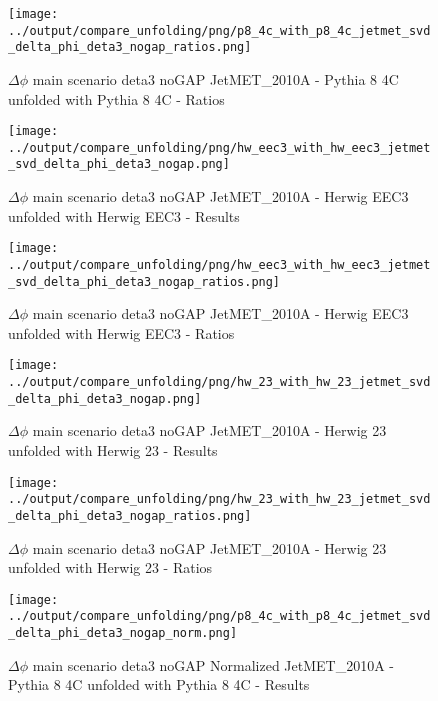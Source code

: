 \documentclass[11pt]{book}
\begin{document}
\begin{figure}[ht]
\centering
\texttt{[image: ../output/compare\_unfolding/png/p8\_4c\_with\_p8\_4c\_jetmet\_svd\_delta\_phi\_deta3\_nogap\_ratios.png]}
\caption{$\Delta\phi$ main scenario deta3 noGAP JetMET\_2010A - Pythia 8 4C unfolded with Pythia 8 4C - Ratios}
\label{p8_p8_jetmet_svd_delta_phi_deta3_nogap_b}
\end{figure}

\begin{figure}[ht]
\centering
\texttt{[image: ../output/compare\_unfolding/png/hw\_eec3\_with\_hw\_eec3\_jetmet\_svd\_delta\_phi\_deta3\_nogap.png]}
\caption{$\Delta\phi$ main scenario deta3 noGAP JetMET\_2010A - Herwig EEC3 unfolded with Herwig EEC3 - Results}
\label{hw_eec3_hw_eec3_jetmet_svd_delta_phi_deta3_nogap_a}
\end{figure}

\begin{figure}[ht]
\centering
\texttt{[image: ../output/compare\_unfolding/png/hw\_eec3\_with\_hw\_eec3\_jetmet\_svd\_delta\_phi\_deta3\_nogap\_ratios.png]}
\caption{$\Delta\phi$ main scenario deta3 noGAP JetMET\_2010A - Herwig EEC3 unfolded with Herwig EEC3 - Ratios}
\label{hw_eec3_hw_eec3_jetmet_svd_delta_phi_deta3_nogap_b}
\end{figure}

\begin{figure}[ht]
\centering
\texttt{[image: ../output/compare\_unfolding/png/hw\_23\_with\_hw\_23\_jetmet\_svd\_delta\_phi\_deta3\_nogap.png]}
\caption{$\Delta\phi$ main scenario deta3 noGAP JetMET\_2010A - Herwig 23 unfolded with Herwig 23 - Results}
\label{hw_23_hw_23_jetmet_svd_delta_phi_deta3_nogap_a}
\end{figure}

\begin{figure}[ht]
\centering
\texttt{[image: ../output/compare\_unfolding/png/hw\_23\_with\_hw\_23\_jetmet\_svd\_delta\_phi\_deta3\_nogap\_ratios.png]}
\caption{$\Delta\phi$ main scenario deta3 noGAP JetMET\_2010A - Herwig 23 unfolded with Herwig 23 - Ratios}
\label{hw_23_hw_23_jetmet_svd_delta_phi_deta3_nogap_b}
\end{figure}


\begin{figure}[ht]
\centering
\texttt{[image: ../output/compare\_unfolding/png/p8\_4c\_with\_p8\_4c\_jetmet\_svd\_delta\_phi\_deta3\_nogap\_norm.png]}
\caption{$\Delta\phi$ main scenario deta3 noGAP Normalized JetMET\_2010A - Pythia 8 4C unfolded with Pythia 8 4C - Results}
\label{p8_p8_jetmet_svd_delta_phi_deta3_nogap_norm_a}
\end{figure}
\end{document}
